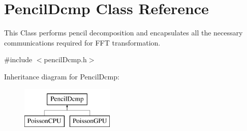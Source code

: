 \hypertarget{classPencilDcmp}{}\section{Pencil\+Dcmp Class Reference}
\label{classPencilDcmp}


This Class performs pencil decomposition and encapsulates all the necessary communications required for F\+FT transformation.  




{\ttfamily \#include $<$pencil\+Dcmp.\+h$>$}

Inheritance diagram for Pencil\+Dcmp\+:\begin{figure}[H]
\begin{center}
\leavevmode
\includegraphics[height=2.000000cm]{classPencilDcmp}
\end{center}
\end{figure}

